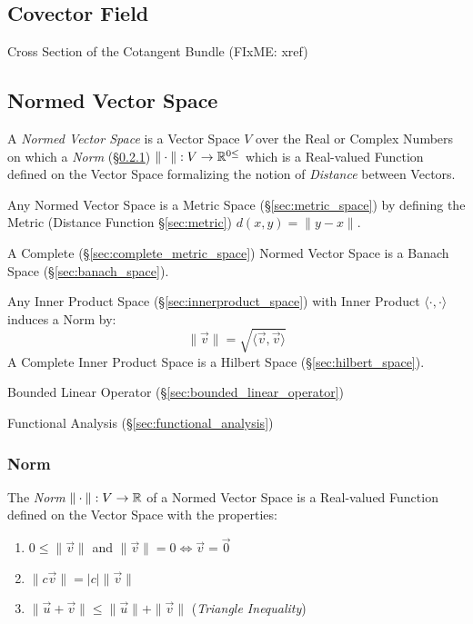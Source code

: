 \subsection{Covector Field}\label{sec:covector_field}

Cross Section of the Cotangent Bundle (FIxME: xref)



\subsection{Normed Vector Space}\label{sec:normed_vectorspace}

A \emph{Normed Vector Space} is a Vector Space $V$ over the Real or Complex
Numbers on which a \emph{Norm} (\S\ref{sec:norm}) $\|\cdot\| : V \rightarrow
\mathbb{R}^{0\leq}$ which is a Real-valued Function defined on the Vector Space
formalizing the notion of \emph{Distance} between Vectors.

Any Normed Vector Space is a Metric Space (\S\ref{sec:metric_space}) by
defining the Metric (Distance Function \S\ref{sec:metric}) $d(x,y) = \|y-x\|$.

A Complete (\S\ref{sec:complete_metric_space}) Normed Vector Space is a Banach
Space (\S\ref{sec:banach_space}).

Any Inner Product Space (\S\ref{sec:innerproduct_space}) with Inner Product
$\langle{\cdot,\cdot}\rangle$ induces a Norm by:
\[
  \|\vec{v}\| = \sqrt{\langle{\vec{v},\vec{v}}\rangle}
\]
A Complete Inner Product Space is a Hilbert Space (\S\ref{sec:hilbert_space}).

Bounded Linear Operator (\S\ref{sec:bounded_linear_operator})

Functional Analysis (\S\ref{sec:functional_analysis})



\subsubsection{Norm}\label{sec:norm}

The \emph{Norm} $\|\cdot\| : V \rightarrow \mathbb{R}$ of a Normed Vector Space is
a Real-valued Function defined on the Vector Space with the properties:
\begin{enumerate}
  \item $0 \leq \|\vec{v}\|$ and
    $\|\vec{v}\| = 0 \Leftrightarrow \vec{v} = \vec{0}$
  \item $\|c\vec{v}\| = |c|\|\vec{v}\|$
  \item $\|\vec{u} + \vec{v}\| \leq \|\vec{u}\| + \|\vec{v}\|$ (\emph{Triangle
    Inequality})
\end{enumerate}


